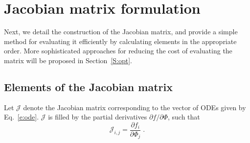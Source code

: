 \documentclass[preprint,12pt]{elsarticle}
\newcommand{ \dydx } [2] { \frac{ \partial #1 }{ \partial #2 } }
\begin{document}
\section{Jacobian matrix formulation}

Next, we detail the construction of the Jacobian matrix, and provide a simple method for evaluating it efficiently by calculating elements in the appropriate order.
More sophisticated approaches for reducing the cost of evaluating the matrix will be proposed in Section~\ref{S:opt}.

\subsection{Elements of the Jacobian matrix}

Let $\mathcal{J}$ denote the Jacobian matrix corresponding to the vector of ODEs given by Eq.~\eqref{e:ode}.
$\mathcal{J}$ is filled by the partial derivatives $\partial f / \partial \Phi$, such that
\begin{equation}
\mathcal{J}_{i,j} = \dydx{f_i}{\Phi_j} \;.
\end{equation}

\end{document}
